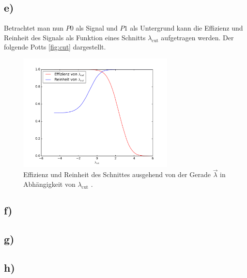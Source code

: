 \subsection{e)}
\label{subsec:a1e}
Betrachtet man nun $P0$ als Signal und $P1$ als Untergrund kann die
Effizienz und Reinheit des Signals als Funktion eines Schnitts
$\lambda_\mathrm{cut}$ aufgetragen werden.
Der folgende Potts \ref{fig:cut}
dargestellt.

\begin{figure}
  \centering
  \includegraphics[width=0.7\textwidth]{Eff_Rein.pdf}
  \caption{Effizienz und Reinheit des Schnittes ausgehend von der Gerade $\vec \lambda$ in Abhängigkeit von $\lambda_\text{cut}$ .}
  \label{fig:cut1}
\end{figure}

\FloatBarrier

\subsection{f)}
\label{subsec:a1f}

\subsection{g)}
\label{subsec:a1g}

\subsection{h)}
\label{subsec:a1h}
